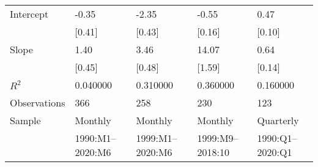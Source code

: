 \begin{tabular}{lllll}
\toprule
\midrule
Intercept & -0.35 & -2.35 & -0.55 & 0.47 \\
 & [0.41] & [0.43] & [0.16] & [0.10] \\
Slope & 1.40 & 3.46 & 14.07 & 0.64 \\
 & [0.45] & [0.48] & [1.59] & [0.14] \\
$R^2$ & 0.040000 & 0.310000 & 0.360000 & 0.160000 \\
Observations & 366 & 258 & 230 & 123 \\
Sample & Monthly & Monthly & Monthly & Quarterly \\
 & 1990:M1--2020:M6 & 1999:M1--2020:M6 & 1999:M9--2018:10 & 1990:Q1--2020:Q1 \\
\bottomrule
\end{tabular}
